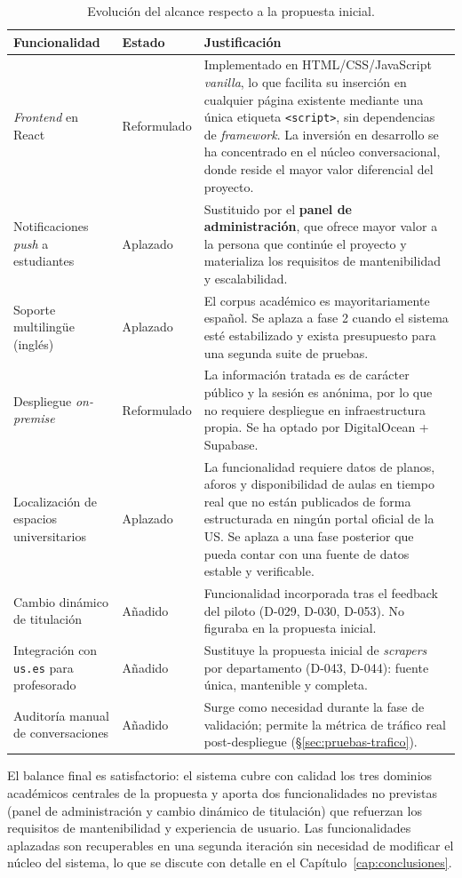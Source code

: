 \begin{table}[hbtp]
\centering
\small
\caption{Evolución del alcance respecto a la propuesta inicial.}\label{tab:req-evolucion}
\begin{tabular}{|p{3.0cm}|p{2.0cm}|p{7.5cm}|}
\hline
\textbf{Funcionalidad} & \textbf{Estado} & \textbf{Justificación} \\ \hline
\textit{Frontend} en React & Reformulado & Implementado en HTML/CSS/JavaScript \textit{vanilla}, lo que facilita su inserci\'on en cualquier p\'agina existente mediante una \'unica etiqueta \texttt{\textless{}script\textgreater{}}, sin dependencias de \textit{framework}. La inversi\'on en desarrollo se ha concentrado en el n\'ucleo conversacional, donde reside el mayor valor diferencial del proyecto. \\ \hline
Notificaciones \textit{push} a estudiantes & Aplazado & Sustituido por el \textbf{panel de administración}, que ofrece mayor valor a la persona que continúe el proyecto y materializa los requisitos de mantenibilidad y escalabilidad. \\ \hline
Soporte multilingüe (inglés) & Aplazado & El corpus académico es mayoritariamente español. Se aplaza a fase 2 cuando el sistema esté estabilizado y exista presupuesto para una segunda suite de pruebas. \\ \hline
Despliegue \textit{on-premise} & Reformulado & La información tratada es de carácter público y la sesión es anónima, por lo que no requiere despliegue en infraestructura propia. Se ha optado por DigitalOcean + Supabase. \\ \hline
Localización de espacios universitarios & Aplazado & La funcionalidad requiere datos de planos, aforos y disponibilidad de aulas en tiempo real que no están publicados de forma estructurada en ningún portal oficial de la US. Se aplaza a una fase posterior que pueda contar con una fuente de datos estable y verificable. \\ \hline
Cambio dinámico de titulación & Añadido & Funcionalidad incorporada tras el feedback del piloto (D-029, D-030, D-053). No figuraba en la propuesta inicial. \\ \hline
Integración con \texttt{us.es} para profesorado & Añadido & Sustituye la propuesta inicial de \textit{scrapers} por departamento (D-043, D-044): fuente única, mantenible y completa. \\ \hline
Auditoría manual de conversaciones & Añadido & Surge como necesidad durante la fase de validación; permite la métrica de tráfico real post-despliegue (\S\ref{sec:pruebas-trafico}). \\ \hline
\end{tabular}
\end{table}

El balance final es satisfactorio: el sistema cubre con calidad los tres dominios académicos centrales de la propuesta y aporta dos funcionalidades no previstas (panel de administración y cambio dinámico de titulación) que refuerzan los requisitos de mantenibilidad y experiencia de usuario. Las funcionalidades aplazadas son recuperables en una segunda iteración sin necesidad de modificar el núcleo del sistema, lo que se discute con detalle en el Capítulo~\ref{cap:conclusiones}.
